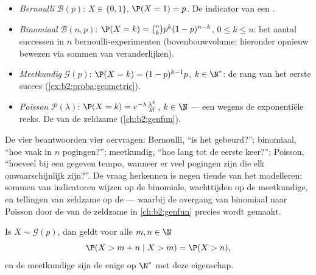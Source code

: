 \begin{example}\label{ex:b2:randomvar:laws}
\leavevmode
\begin{itemize}
\item \emph{Bernoulli} $\mathcal{B}(p)$: $X \in \{0, 1\}$, $\P(X =
1) = p$. De indicator van een .
\item \emph{Binomiaal} $\mathcal{B}(n, p)$: $\P(X = k) = \binom nk
p^k(1-p)^{n-k}$, $0 \leq k \leq n$: het aantal successen in $n$
 bernoulli-experimenten (bovenbouwvolume; hieronder
opnieuw bewezen via sommen van  veranderlijken).
\item \emph{Meetkundig} $\mathcal{G}(p)$: $\P(X = k) =
(1-p)^{k-1}p$, $k \in \N^*$: de rang van het eerste succes
(\cref{ex:b2:proba:geometric}).
\item \emph{Poisson} $\mathcal{P}(\lambda)$: $\P(X = k) =
e^{-\lambda}\frac{\lambda^k}{k!}$, $k \in \N$ --- een 
wegens de exponentiële reeks. De  van de zeldzame
 (\cref{ch:b2:genfun}).
\end{itemize}
\end{example}

\begin{remark}
De vier  beantwoorden vier oervragen: Bernoulli, ``is
het gebeurd?''; binomiaal, ``hoe vaak in $n$ pogingen?'';
meetkundig, ``hoe lang tot de eerste keer?''; Poisson, ``hoeveel
 bij een gegeven tempo, wanneer er veel pogingen zijn
die elk onwaarschijnlijk zijn?''. De vraag herkennen is negen
tiende van het modelleren: sommen van indicatoren wijzen op de
binomiale, wachttijden op de meetkundige, en tellingen van zeldzame
 op de  --- waarbij de overgang van
binomiaal naar Poisson door de  van de zeldzame
 in \cref{ch:b2:genfun} precies wordt gemaakt.
\end{remark}

\begin{proposition}\label{prop:b2:randomvar:memoryless}
Is $X \sim \mathcal{G}(p)$, dan geldt voor alle $m, n \in \N$
\[
\P(X > m + n \mid X > m) = \P(X > n) ,
\]
en de meetkundige  zijn de enige  op $\N^*$
met deze eigenschap.
\end{proposition}

